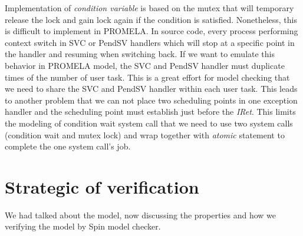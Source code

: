 Implementation of \textit{condition variable} is based on the mutex that will temporary release the lock and gain lock again if the condition is satisfied. Nonetheless, this is difficult to implement in PROMELA. In source code, every process performing context switch in SVC or PendSV handlers which will stop at a specific point in the handler and resuming when switching back. If we want to emulate this behavior in PROMELA model, the SVC and PendSV handler must duplicate times of the number of user task. This is a great effort for model checking that we need to share the SVC and PendSV handler within each user task. This leads to another problem that we can not place two scheduling points in one exception handler and the scheduling point must establish just before the \textit{IRet}. This limits the modeling of condition wait system call that we need to use two system calls (condition wait and mutex lock) and wrap together with \textit{atomic} statement to complete the one system call's job.

\section{Strategic of verification}
We had talked about the model, now discussing the properties and how we verifying the model by Spin model checker.

